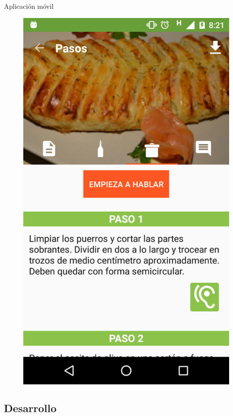 \documentclass[10pt,xcolor=svgnames]{beamer}
\begin{document}
\begin{frame}{Aplicación móvil}
\begin{minipage}{\linewidth}
    \begin{minipage}{0.4\linewidth}
      \begin{figure}[H]
        \includegraphics[width=\linewidth]{img/captura_11}
      \end{figure}
    \end{minipage}
  \end{minipage}
\end{frame}


\subsection{Desarrollo}
\end{document}
